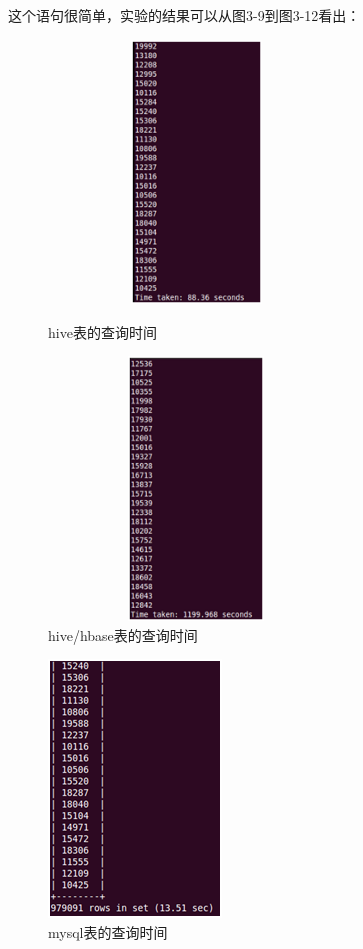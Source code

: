 这个语句很简单，实验的结果可以从图3-9到图3-12看出：
\clearpage
\begin{description}

\item
\begin{figure}[h]
\begin{minipage}[t]{0.4\linewidth}
\centering
\includegraphics[width=0.7\textwidth,height=7cm]{photo/djh1.png}
\caption{hive表的查询时间}
\end{minipage}
\hfill
\begin{minipage}[t]{0.4\linewidth}
\centering
\includegraphics[width=0.7\textwidth,height=7cm]{photo/djh2.png}
\caption{hive/hbase表的查询时间}
\end{minipage}
\end{figure}

\item
\begin{figure}[!ht]
\centering
\includegraphics[]{photo/djm1.png} 
\caption{mysql表的查询时间}
\end{figure} 


\end{description}
